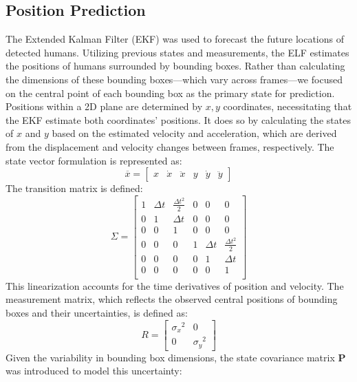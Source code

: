 \documentclass{article}
\begin{document}
\subsection{Position Prediction}
The Extended Kalman Filter (EKF) was used to forecast the future locations of detected humans. Utilizing previous states and measurements, the ELF estimates the positions of humans surrounded by bounding boxes. Rather than calculating the dimensions of these bounding boxes—which vary across frames—we focused on the central point of each bounding box as the primary state for prediction.
Positions within a 2D plane are determined by \(x, y\) coordinates, necessitating that the EKF estimate both coordinates' positions. It does so by calculating the states of \(x\) and \(y\) based on the estimated velocity and acceleration, which are derived from the displacement and velocity changes between frames, respectively.
The state vector formulation is represented as:
\begin{equation}    \overline{x} = \begin{bmatrix} x & \dot{x} & \ddot{x} & y & \dot{y} & \ddot{y} \end{bmatrix}    \label{StateVec}\end{equation}
The transition matrix is defined:
\begin{equation}    \Sigma = \begin{bmatrix}1 & \Delta{t} & \frac{{\Delta{t}}^2}{2} & 0 & 0 & 0\\0 & 1 & \Delta{t} & 0 & 0 & 0\\0 & 0 & 1 & 0 & 0 & 0\\0 & 0 & 0 & 1 & \Delta{t} & \frac{{\Delta{t}}^2}{2}\\0 & 0 & 0 & 0 & 1 & \Delta{t}\\0 & 0 & 0 & 0 & 0 & 1\\\end{bmatrix}    \label{TransMat}\end{equation}
This linearization accounts for the time derivatives of position and velocity. The measurement matrix, which reflects the observed central positions of bounding boxes and their uncertainties, is defined as:
\begin{equation}    R = \begin{bmatrix} {{\sigma}_x}^2 & 0 \\ 0 & {{\sigma}_y}^2 \end{bmatrix}    \label{MeasurementMat}\end{equation}
Given the variability in bounding box dimensions, the state covariance matrix \(\textbf{P}\) was introduced to model this uncertainty:
\end{document}
